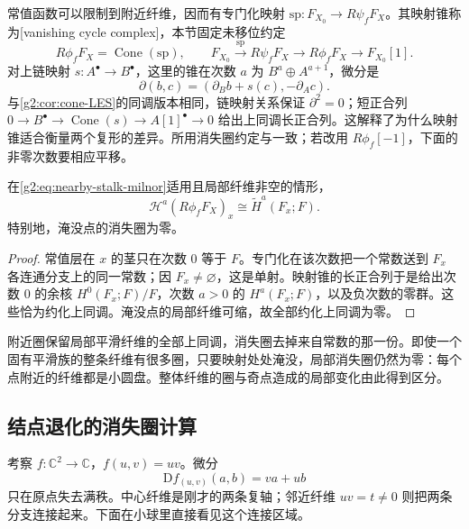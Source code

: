 \ProseParagraphBreak

常值函数可以限制到附近纤维，因而有专门化映射 \(\mathrm{sp}:F_{X_0}\to R\psi_fF_X\)。其映射锥称为[vanishing cycle complex]，本节固定未移位约定
\begin{equation}\label{g2:eq:vanishing-cycle-triangle}
	R\phi_fF_X=\operatorname{Cone}(\mathrm{sp}),\qquad
	F_{X_0}\xrightarrow{\mathrm{sp}}R\psi_fF_X
	\longrightarrow R\phi_fF_X\longrightarrow F_{X_0}[1].
\end{equation}
对上链映射 \(s:A^\bullet\to B^\bullet\)，这里的锥在次数 \(a\) 为 \(B^a\oplus A^{a+1}\)，微分是
\[
	\partial(b,c)=(\partial_Bb+s(c),-\partial_Ac).
\]
与\cref{g2:cor:cone-LES}的同调版本相同，链映射关系保证 \(\partial^2=0\)；短正合列 \(0\to B^\bullet\to\operatorname{Cone}(s)\to A[1]^\bullet\to0\) 给出上同调长正合列。这解释了为什么映射锥适合衡量两个复形的差异。所用消失圈约定与\cite[定义4.2.4]{Dimca2004Sheaves}一致；若改用 \(R\phi_f[-1]\)，下面的非零次数要相应平移。

\begin{proposition}\label{g2:prop:vanishing-reduced-fiber}
	在\cref{g2:eq:nearby-stalk-milnor}适用且局部纤维非空的情形，
	\[
		\mathcal H^a(R\phi_fF_X)_x\cong\widetilde H^a(F_x;F).
	\]
	特别地，淹没点的消失圈为零。
\end{proposition}
\begin{proof}
	常值层在 \(x\) 的茎只在次数 \(0\) 等于 \(F\)。专门化在该次数把一个常数送到 \(F_x\) 各连通分支上的同一常数；因 \(F_x\ne\varnothing\)，这是单射。映射锥的长正合列于是给出次数 \(0\) 的余核 \(H^0(F_x;F)/F\)，次数 \(a>0\) 的 \(H^a(F_x;F)\)，以及负次数的零群。这些恰为约化上同调。淹没点的局部纤维可缩，故全部约化上同调为零。
\end{proof}

附近圈保留局部平滑纤维的全部上同调，消失圈去掉来自常数的那一份。即使一个固有平滑族的整条纤维有很多圈，只要映射处处淹没，局部消失圈仍然为零：每个点附近的纤维都是小圆盘。整体纤维的圈与奇点造成的局部变化由此得到区分。

\subsection{结点退化的消失圈计算}
\label{g2:subsec:B04:04}

考察 \(f:\mathbb C^2\to\mathbb C\)，\(f(u,v)=uv\)。微分
\[
	\mathrm{D}f_{(u,v)}(a,b)=va+ub
\]
只在原点失去满秩。中心纤维是刚才的两条复轴；邻近纤维 \(uv=t\ne0\) 则把两条分支连接起来。下面在小球里直接看见这个连接区域。


